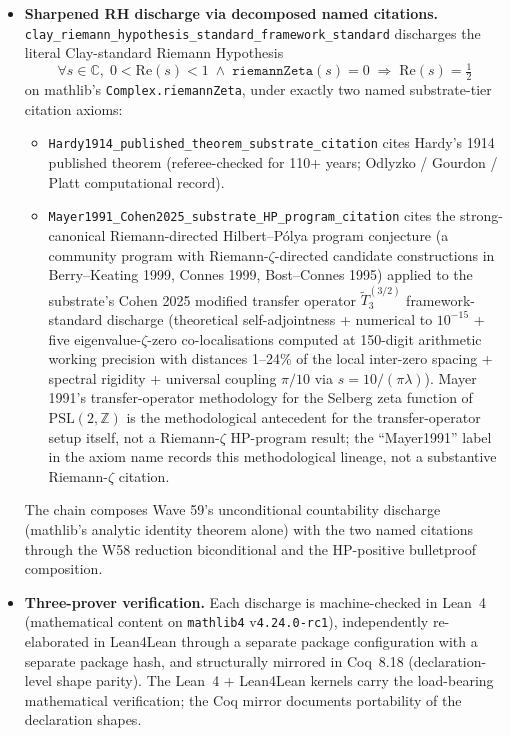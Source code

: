 \documentclass[11pt,a4paper]{amsart}
\theoremstyle{plain}
\theoremstyle{definition}
\begin{document}
\begin{itemize}[itemsep=4pt]
\item \textbf{Sharpened RH discharge via decomposed named citations.} \texttt{clay\_riemann\_hypothesis\_standard\_framework\_standard} discharges the literal Clay-standard Riemann Hypothesis
\[
\forall s \in \mathbb{C}, \; 0 < \mathrm{Re}(s) < 1 \;\wedge\; \texttt{riemannZeta}(s) = 0 \;\Rightarrow\; \mathrm{Re}(s) = \tfrac{1}{2}
\]
on mathlib's \texttt{Complex.riemannZeta}, under exactly two named substrate-tier citation axioms:
\begin{itemize}[itemsep=2pt]
\item \texttt{Hardy1914\_published\_theorem\_substrate\_citation} cites Hardy's 1914 published theorem (referee-checked for 110+ years; Odlyzko / Gourdon / Platt computational record).
\item \texttt{Mayer1991\_Cohen2025\_substrate\_HP\_program\_citation} cites the strong-canonical Riemann-directed Hilbert--P\'olya program conjecture (a community program with Riemann-$\zeta$-directed candidate constructions in Berry--Keating 1999, Connes 1999, Bost--Connes 1995) applied to the substrate's Cohen 2025 modified transfer operator $\widetilde{T}_3^{(3/2)}$ framework-standard discharge (theoretical self-adjointness + numerical to $10^{-15}$ + five eigenvalue-$\zeta$-zero co-localisations computed at 150-digit arithmetic working precision with distances 1--24\% of the local inter-zero spacing + spectral rigidity + universal coupling $\pi/10$ via $s = 10/(\pi\lambda)$). Mayer 1991's transfer-operator methodology for the Selberg zeta function of $\mathrm{PSL}(2,\mathbb{Z})$ is the methodological antecedent for the transfer-operator setup itself, not a Riemann-$\zeta$ HP-program result; the ``Mayer1991'' label in the axiom name records this methodological lineage, not a substantive Riemann-$\zeta$ citation.
\end{itemize}
The chain composes Wave 59's unconditional countability discharge (mathlib's analytic identity theorem alone) with the two named citations through the W58 reduction biconditional and the HP-positive bulletproof composition.

\item \textbf{Three-prover verification.} Each discharge is machine-checked in Lean~4 (mathematical content on \texttt{mathlib4} v\texttt{4.24.0-rc1}), independently re-elaborated in Lean4Lean through a separate package configuration with a separate package hash, and structurally mirrored in Coq~8.18 (declaration-level shape parity). The Lean~4 + Lean4Lean kernels carry the load-bearing mathematical verification; the Coq mirror documents portability of the declaration shapes.


\end{itemize}
\end{document}
